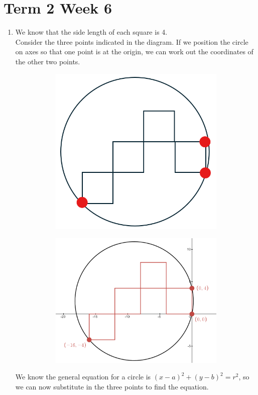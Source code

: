 \documentclass[../main.tex]{subfiles}
\begin{document}
\section*{Term 2 Week 6}
\begin{enumerate}
    \item 
    We know that the side length of each square is 4.\\
    Consider the three points indicated in the diagram. If we position the circle on axes so that one point is at the origin, we can work out the coordinates of the other two points.
    \begin{figure}[H]
        \centering
        \begin{subfigure}{0.4\textwidth}
            \includegraphics[width=0.5\linewidth]{images/t2w6q1_2.png}
        \end{subfigure}
        \begin{subfigure}{0.4\textwidth}
            \includegraphics[width=0.7\linewidth]{images/t2w6q1_3.png}
        \end{subfigure}
    \end{figure}
    
    We know the general equation for a circle is \((x-a)^2+(y-b)^2=r^2\), so we can now substitute in the three points to find the equation.\\


\end{enumerate}
\end{document}
